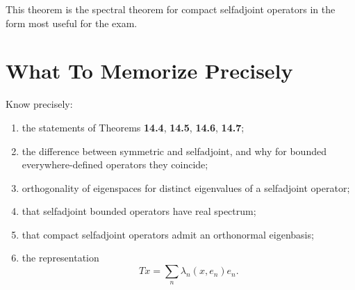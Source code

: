 \documentclass[11pt]{article}
\begin{document}
\begin{focusbox}
This theorem is the spectral theorem for compact selfadjoint operators in the form most useful for the exam.
\end{focusbox}

\section{What To Memorize Precisely}

\begin{focusbox}
Know precisely:
\begin{enumerate}
\item the statements of Theorems \textbf{14.4}, \textbf{14.5}, \textbf{14.6}, \textbf{14.7};
\item the difference between symmetric and selfadjoint, and why for bounded everywhere-defined operators they coincide;
\item orthogonality of eigenspaces for distinct eigenvalues of a selfadjoint operator;
\item that selfadjoint bounded operators have real spectrum;
\item that compact selfadjoint operators admit an orthonormal eigenbasis;
\item the representation
\[
Tx=\sum_n \lambda_n(x,e_n)e_n.
\]
\end{enumerate}
\end{focusbox}
\end{document}
